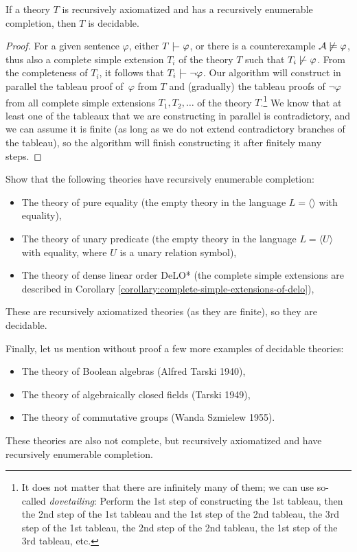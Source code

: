 \begin{proposition}\label{propositon:recursively-enumerable-completion}    
    If a theory $T$ is recursively axiomatized and has a recursively enumerable completion, then $T$ is decidable.
\end{proposition}
\begin{proof}
For a given sentence $\varphi$, either $T \proves \varphi$, or there is a counterexample $\mathcal{A} \not\models \varphi$, thus also a complete simple extension $T_i$ of the theory $T$ such that $T_i \not\proves \varphi$. From the completeness of $T_i$, it follows that $T_i \proves \neg \varphi$. Our algorithm will construct in parallel the tableau proof of~$\varphi$ from $T$ and (gradually) the tableau proofs of $\neg \varphi$ from all complete simple extensions $T_1, T_2, \dots$ of the theory $T$.\footnote{It does not matter that there are infinitely many of them; we can use so-called \emph{dovetailing}: Perform the 1st step of constructing the 1st tableau, then the 2nd step of the 1st tableau and the 1st step of the 2nd tableau, the 3rd step of the 1st tableau, the 2nd step of the 2nd tableau, the 1st step of the 3rd tableau, etc.} We know that at least one of the tableaux that we are constructing in parallel is contradictory, and we can assume it is finite (as long as we do not extend contradictory branches of the tableau), so the algorithm will finish constructing it after finitely many steps.
\end{proof}

\begin{exercise}
Show that the following theories have recursively enumerable completion:
\begin{itemize}
\item The theory of pure equality (the empty theory in the language $L = \langle \rangle$ with equality),
\item The theory of unary predicate (the empty theory in the language $L = \langle U \rangle$ with equality, where $U$ is a unary relation symbol),
\item The theory of dense linear order DeLO* (the complete simple extensions are described in Corollary \ref{corollary:complete-simple-extensions-of-delo}),
\end{itemize}
These are recursively axiomatized theories (as they are finite), so they are decidable.
\end{exercise}

\begin{example}
    Finally, let us mention without proof a few more examples of decidable theories:
    \begin{itemize}  
        \item The theory of Boolean algebras (Alfred Tarski 1940),
        \item The theory of algebraically closed fields (Tarski 1949),
        \item The theory of commutative groups (Wanda Szmielew 1955).
    \end{itemize}
    These theories are also not complete, but recursively axiomatized and have recursively enumerable completion.    
\end{example}

